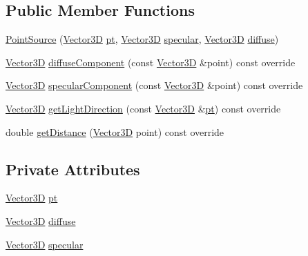 \subsection*{Public Member Functions}
\begin{DoxyCompactItemize}
\item 
\mbox{\hyperlink{classPointSource_a45ecabcd8c8aab5cc5bcaa88a0357d58}{Point\+Source}} (\mbox{\hyperlink{classVector3D}{Vector3D}} \mbox{\hyperlink{classPointSource_a42114a0433eca4114a77a3f8cb9e41e1}{pt}}, \mbox{\hyperlink{classVector3D}{Vector3D}} \mbox{\hyperlink{classPointSource_ae02434997baef2749ca6eaa61e98e496}{specular}}, \mbox{\hyperlink{classVector3D}{Vector3D}} \mbox{\hyperlink{classPointSource_af56ac7fa441b50c514037dd624d7c184}{diffuse}})
\item 
\mbox{\hyperlink{classVector3D}{Vector3D}} \mbox{\hyperlink{classPointSource_a445e9566d2226d1b8afd76274fb006fb}{diffuse\+Component}} (const \mbox{\hyperlink{classVector3D}{Vector3D}} \&point) const override
\item 
\mbox{\hyperlink{classVector3D}{Vector3D}} \mbox{\hyperlink{classPointSource_a421e0e8d3d1f69aeb095f1f9c39de7e0}{specular\+Component}} (const \mbox{\hyperlink{classVector3D}{Vector3D}} \&point) const override
\item 
\mbox{\hyperlink{classVector3D}{Vector3D}} \mbox{\hyperlink{classPointSource_a02a13a7b955088e32324bfb3d49b1ace}{get\+Light\+Direction}} (const \mbox{\hyperlink{classVector3D}{Vector3D}} \&\mbox{\hyperlink{classPointSource_a42114a0433eca4114a77a3f8cb9e41e1}{pt}}) const override
\item 
double \mbox{\hyperlink{classPointSource_a5f1af9abccf0657b9398555c935bb8bc}{get\+Distance}} (\mbox{\hyperlink{classVector3D}{Vector3D}} point) const override
\end{DoxyCompactItemize}
\subsection*{Private Attributes}
\begin{DoxyCompactItemize}
\item 
\mbox{\hyperlink{classVector3D}{Vector3D}} \mbox{\hyperlink{classPointSource_a42114a0433eca4114a77a3f8cb9e41e1}{pt}}
\item 
\mbox{\hyperlink{classVector3D}{Vector3D}} \mbox{\hyperlink{classPointSource_af56ac7fa441b50c514037dd624d7c184}{diffuse}}
\item 
\mbox{\hyperlink{classVector3D}{Vector3D}} \mbox{\hyperlink{classPointSource_ae02434997baef2749ca6eaa61e98e496}{specular}}
\end{DoxyCompactItemize}



